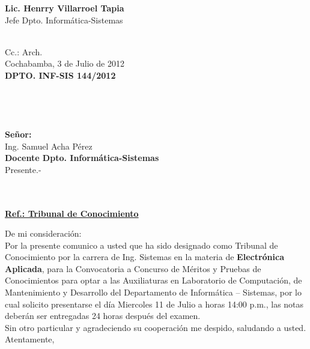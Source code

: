 \documentclass[letterpaper,11pt]{letter}
\begin{document}
\vspace{3.5cm}
\begin{center}
\begin{minipage}[b]{0.5\textwidth}
\begin{center}
{\bf Lic. Henrry Villarroel Tapia}\\
Jefe Dpto. Informática-Sistemas\\
\end{center}
\end{minipage}
\end{center}
~\\
Cc.: Arch.\\
\newpage
Cochabamba, 3 de Julio de 2012~\\
 \textbf{DPTO. INF-SIS 144/2012}\\
~\\
~\\
~\\
~\\
 \textbf{Señor:}~\\
Ing. Samuel Acha Pérez~\\
 \textbf{Docente Dpto. Informática-Sistemas}~\\
Presente.-\\
~\\
~\\
\begin{center}
\underline{ \textbf{Ref.: Tribunal de Conocimiento}}
\end{center}
De mi consideración:\\
Por la presente comunico a usted que ha sido designado como Tribunal de Conocimiento por la carrera de Ing. Sistemas en la materia de \textbf{Electrónica Aplicada}, para la Convocatoria a Concurso de Méritos y Pruebas de Conocimientos para optar a las Auxiliaturas en Laboratorio de Computación, de Mantenimiento y Desarrollo del Departamento de Informática – Sistemas, por lo cual solicito presentarse el día Miercoles 11 de Julio a horas 14:00 p.m., las notas deberán ser entregadas 24 horas después del examen.\\
Sin otro particular y agradeciendo su cooperación me despido, saludando a usted.\\
Atentamente,\\
\end{document}
